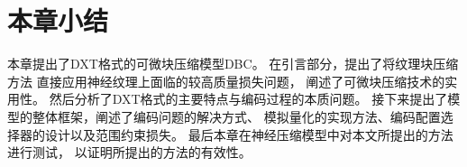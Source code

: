 \section{本章小结}

本章提出了DXT格式的可微块压缩模型DBC。
在引言部分，提出了将纹理块压缩方法
直接应用神经纹理上面临的较高质量损失问题，
阐述了可微块压缩技术的实用性。
然后分析了DXT格式的主要特点与编码过程的本质问题。
接下来提出了模型的整体框架，阐述了编码问题的解决方式、
模拟量化的实现方法、编码配置选择器的设计以及范围约束损失。
最后本章在神经压缩模型中对本文所提出的方法进行测试，
以证明所提出的方法的有效性。











